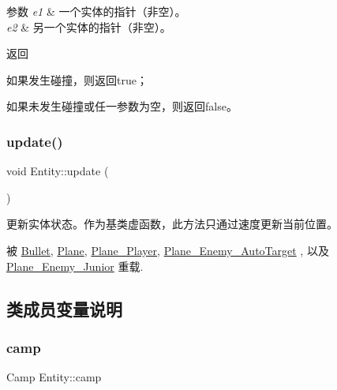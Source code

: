 \begin{DoxyParams}{参数}
{\em e1} & 一个实体的指针（非空）。\\
\hline
{\em e2} & 另一个实体的指针（非空）。 \\
\hline
\end{DoxyParams}
\begin{DoxyReturn}{返回}

\begin{DoxyItemize}
\item 如果发生碰撞，则返回true；
\item 如果未发生碰撞或任一参数为空，则返回false。 
\end{DoxyItemize}
\end{DoxyReturn}
\mbox{\label{class_entity_a00b6eeaf99b35c8f8b10b5fbfc1baf4f}} 
\subsubsection{\texorpdfstring{update()}{update()}}
{\footnotesize\ttfamily void Entity\+::update (\begin{DoxyParamCaption}{ }\end{DoxyParamCaption})\hspace{0.3cm}{\ttfamily [virtual]}}



更新实体状态。作为基类虚函数，此方法只通过速度更新当前位置。 



被 \hyperlink{class_bullet_a32f4a0611fe2dd245fee955d14ca1f68}{Bullet}, \hyperlink{class_plane_a7fbb07f76503fe057772e01f542afc32}{Plane}, \hyperlink{class_plane___player_ae68c08ce11fad9fd164c00eb4db6b348}{Plane\+\_\+\+Player}, \hyperlink{class_plane___enemy___auto_target_a79e6eda540d282205ce6151ae0b304ca}{Plane\+\_\+\+Enemy\+\_\+\+Auto\+Target} , 以及 \hyperlink{class_plane___enemy___junior_a262143737ed740f65063dbcbc5970f55}{Plane\+\_\+\+Enemy\+\_\+\+Junior} 重载.



\subsection{类成员变量说明}
\mbox{\label{class_entity_a5326accd49d3817310ec90692b9da3df}} 
\subsubsection{\texorpdfstring{camp}{camp}}
{\footnotesize\ttfamily Camp Entity\+::camp\hspace{0.3cm}{\ttfamily [protected]}}



